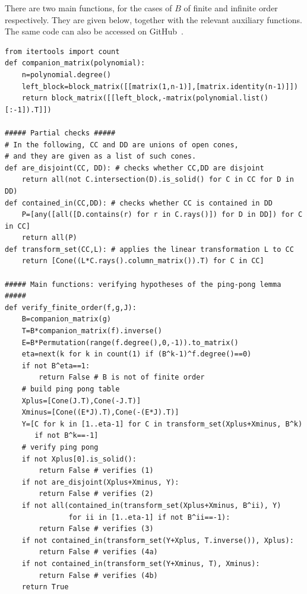 \documentclass[11pt,a4paper]{amsart}
\theoremstyle{definition}
\theoremstyle{definition}
\numberwithin{equation}{section}
\begin{document}
There are two main functions, for the cases of $B$ of finite and infinite order respectively. They are given below, together with the relevant auxiliary functions. The same code can also be accessed on GitHub~\cite{BDN21-s}.

\hspace{0.3cm}
\small
\begin{verbatim}
from itertools import count
def companion_matrix(polynomial):
    n=polynomial.degree()
    left_block=block_matrix([[matrix(1,n-1)],[matrix.identity(n-1)]])
    return block_matrix([[left_block,-matrix(polynomial.list()[:-1]).T]])

##### Partial checks #####
# In the following, CC and DD are unions of open cones,
# and they are given as a list of such cones.
def are_disjoint(CC, DD): # checks whether CC,DD are disjoint
    return all(not C.intersection(D).is_solid() for C in CC for D in DD)
def contained_in(CC,DD): # checks whether CC is contained in DD
    P=[any([all([D.contains(r) for r in C.rays()]) for D in DD]) for C in CC]
    return all(P)
def transform_set(CC,L): # applies the linear transformation L to CC
    return [Cone((L*C.rays().column_matrix()).T) for C in CC]

##### Main functions: verifying hypotheses of the ping-pong lemma #####
def verify_finite_order(f,g,J):
    B=companion_matrix(g)
    T=B*companion_matrix(f).inverse()
    E=B*Permutation(range(f.degree(),0,-1)).to_matrix()
    eta=next(k for k in count(1) if (B^k-1)^f.degree()==0)
    if not B^eta==1:
        return False # B is not of finite order
    # build ping pong table
    Xplus=[Cone(J.T),Cone(-J.T)]
    Xminus=[Cone((E*J).T),Cone(-(E*J).T)]
    Y=[C for k in [1..eta-1] for C in transform_set(Xplus+Xminus, B^k)
       if not B^k==-1]
    # verify ping pong
    if not Xplus[0].is_solid():
        return False # verifies (1)
    if not are_disjoint(Xplus+Xminus, Y):
        return False # verifies (2)
    if not all(contained_in(transform_set(Xplus+Xminus, B^ii), Y) 
               for ii in [1..eta-1] if not B^ii==-1):
        return False # verifies (3)
    if not contained_in(transform_set(Y+Xplus, T.inverse()), Xplus):
        return False # verifies (4a)
    if not contained_in(transform_set(Y+Xminus, T), Xminus):
        return False # verifies (4b)
    return True


\end{verbatim}
\end{document}
